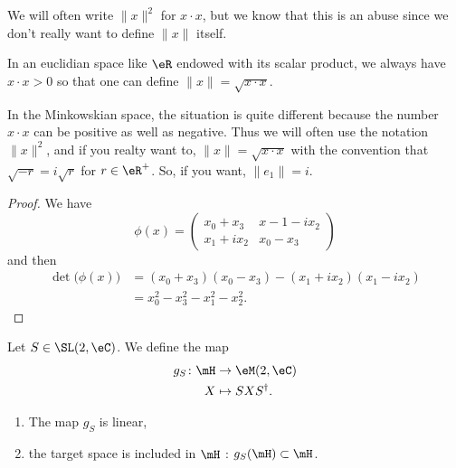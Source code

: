 \begin{normaltext}
    We will often write \( \| x \|^2\) for \( x\cdot x\), but we know that this is an abuse since we don't really want to define \( \| x \|\) itself.

    In an euclidian space like \( \eR\) endowed with its scalar product, we always have \( x\cdot x>0\) so that one can define \( \| x \|=\sqrt{ x\cdot x }\). 

    In the Minkowskian space, the situation is quite different because the number \( x\cdot x\) can be positive as well as negative. Thus we will often use the notation \( \| x \|^2\), and if you realty want to, \( \| x \|=\sqrt{ x\cdot x }\) with the convention that \( \sqrt{ - r }=i\sqrt{ r }\) for \( r\in \eR^+\). So, if you want, \( \| e_1 \|=i\).
\end{normaltext}

\begin{proof}
    We have
    \begin{equation}
        \phi(x)=\begin{pmatrix}
            x_0+x_3    &   x-1-ix_2    \\ 
            x_1+ix_2    &   x_0-x_3    
        \end{pmatrix}
    \end{equation}
    and then
    \begin{subequations}
        \begin{align}
            \det\big( \phi(x) \big)&=(x_0+x_3)(x_0-x_3)-(x_1+ix_2)(x_1-ix_2)\\
            &=x_0^2-x_3^2-x_1^2-x_2^2.
        \end{align}
    \end{subequations}
\end{proof}

\begin{lemma}       \label{LEMooHPSJooEVIaoE}
    Let \( S\in \SL(2,\eC)\). We define the map
    \begin{equation}
        \begin{aligned}
            g_S\colon \mH&\to \eM(2,\eC) \\
            X&\mapsto SXS^{\dag}. 
        \end{aligned}
    \end{equation}
    \begin{enumerate}
        \item
            The map \( g_S\) is linear,
        \item
            the target space is included in \( \mH\) : \( g_S(\mH)\subset \mH\).
    \end{enumerate}
\end{lemma}

